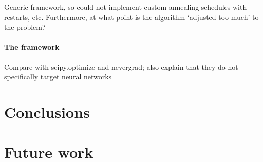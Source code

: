 Generic framework, so could not implement custom annealing schedules with restarts, etc.
Furthermore, at what point is the algorithm `adjusted too much' to the problem?

\paragraph{The framework}
Compare with scipy.optimize and nevergrad; also explain that they do not specifically target neural networks

\section{Conclusions}

\section{Future work}
\label{sec:future_work}